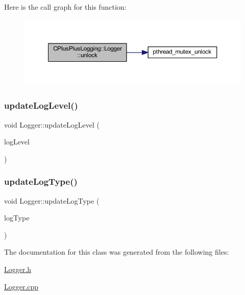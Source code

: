 Here is the call graph for this function\+:
\nopagebreak
\begin{figure}[H]
\begin{center}
\leavevmode
\includegraphics[width=350pt]{class_c_plus_plus_logging_1_1_logger_a28f2a5b3ccfaa9b233675bec5d7cd61d_cgraph}
\end{center}
\end{figure}
\mbox{\label{class_c_plus_plus_logging_1_1_logger_ab40b9674237a65884f83fdc5687ecc34}} 
\subsubsection{\texorpdfstring{update\+Log\+Level()}{updateLogLevel()}}
{\footnotesize\ttfamily void Logger\+::update\+Log\+Level (\begin{DoxyParamCaption}\item[{\mbox{\hyperlink{namespace_c_plus_plus_logging_af665d4fd4cbfd995a475e01ee59870ac}{Log\+Level}}}]{log\+Level }\end{DoxyParamCaption})}

\mbox{\label{class_c_plus_plus_logging_1_1_logger_aeae9b06ce0f5445b2fa05303581b096d}} 
\subsubsection{\texorpdfstring{update\+Log\+Type()}{updateLogType()}}
{\footnotesize\ttfamily void Logger\+::update\+Log\+Type (\begin{DoxyParamCaption}\item[{\mbox{\hyperlink{namespace_c_plus_plus_logging_a4dae38037c368f31976e9db62903ac0d}{Log\+Type}}}]{log\+Type }\end{DoxyParamCaption})}



The documentation for this class was generated from the following files\+:\begin{DoxyCompactItemize}
\item 
\mbox{\hyperlink{_logger_8h}{Logger.\+h}}\item 
\mbox{\hyperlink{_logger_8cpp}{Logger.\+cpp}}\end{DoxyCompactItemize}
